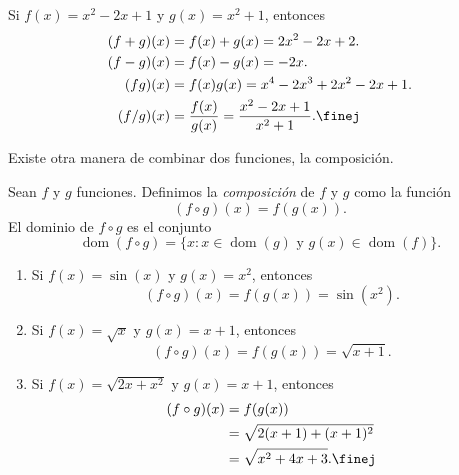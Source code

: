 \documentclass[12pt,a4paper]{book}
\DeclareMathOperator{\dom}{dom}
\begin{document}
    \begin{ejemplo}\label{ejm:8}
        Si $f(x)=x^{2}-2x+1$ y $g(x)=x^{2}+1$,
        entonces
        \begin{align*}
            (f+g)(x)&=f(x)+g(x)=2x^{2}-2x+2.\\
            (f-g)(x)&=f(x)-g(x)=-2x.\\
            (fg)(x)&=f(x)g(x)=x^{4}-2x^{3}+2x^{2}-2x+1.\\
            (f/g)(x)&=\frac{f(x)}{g(x)}=\frac{x^{2}-2x+1}{x^{2}+1}.\finej
        \end{align*}
    \end{ejemplo}

    Existe otra manera de combinar dos funciones, la composición.

    \begin{definicion}\label{def:21}
        Sean $f$ y $g$ funciones.
        Definimos la \textit{composición} de $f$ y $g$ como la función
        \begin{equation*}
            (f\circ g)(x)=f(g(x)).
        \end{equation*}
        El dominio de $f\circ g$ es el conjunto
        \begin{equation*}
            \dom(f\circ g)=\{x:x\in\dom(g)\text{ y }g(x)\in\dom(f)\}.
        \end{equation*}
    \end{definicion}

    \begin{ejemplo}\label{ejm:9}
        \leavevmode
        \begin{enumerate}
            \item Si $f(x)=\sin(x)$ y $g(x)=x^{2}$, entonces
            \begin{equation*}
                (f\circ g)(x)=f(g(x))=\sin\left(x^{2}\right).
            \end{equation*}
            \item Si $f(x)=\sqrt{x}$ y $g(x)=x+1$, entonces
            \begin{equation*}
                (f\circ g)(x)=f(g(x))=\sqrt{x+1}.
            \end{equation*}
            \item Si $f(x)=\sqrt{2x+x^{2}}$ y $g(x)=x+1$, entonces
            \begin{align*}
                (f\circ g)(x)&=f(g(x))\\
                &=\sqrt{2(x+1)+(x+1)^{2}}\\
                &=\sqrt{x^{2}+4x+3}.\finej
            \end{align*}
        \end{enumerate}
    \end{ejemplo}
\end{document}
